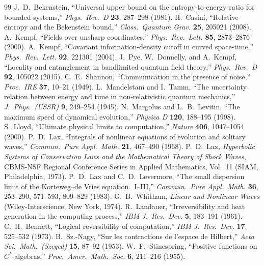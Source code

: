 \documentclass[11pt,a4paper]{article}
\theoremstyle{definition}
\begin{document}
\begin{thebibliography}{99}
 J.\ D.\ Bekenstein, ``Universal upper bound on the entropy-to-energy ratio for bounded systems,'' \emph{Phys.\ Rev.\ D} \textbf{23}, 287--298 (1981).
 H.\ Casini, ``Relative entropy and the Bekenstein bound,'' \emph{Class.\ Quantum Grav.} \textbf{25}, 205021 (2008).
 A.\ Kempf, ``Fields over unsharp coordinates,'' \emph{Phys.\ Rev.\ Lett.} \textbf{85}, 2873--2876 (2000).
 A.\ Kempf, ``Covariant information-density cutoff in curved space-time,'' \emph{Phys.\ Rev.\ Lett.} \textbf{92}, 221301 (2004).
 J.\ Pye, W.\ Donnelly, and A.\ Kempf, ``Locality and entanglement in bandlimited quantum field theory,'' \emph{Phys.\ Rev.\ D} \textbf{92}, 105022 (2015).
 C.\ E.\ Shannon, ``Communication in the presence of noise,'' \emph{Proc.\ IRE} \textbf{37}, 10--21 (1949).
 L.\ Mandelstam and I.\ Tamm, ``The uncertainty relation between energy and time in non-relativistic quantum mechanics,'' \emph{J.\ Phys.\ (USSR)} \textbf{9}, 249--254 (1945).
 N.\ Margolus and L.\ B.\ Levitin, ``The maximum speed of dynamical evolution,'' \emph{Physica D} \textbf{120}, 188--195 (1998).
 S.\ Lloyd, ``Ultimate physical limits to computation,'' \emph{Nature} \textbf{406}, 1047--1054 (2000).
 P.\ D.\ Lax, ``Integrals of nonlinear equations of evolution and solitary waves,'' \emph{Commun.\ Pure Appl.\ Math.} \textbf{21}, 467--490 (1968).
 P.\ D.\ Lax, \emph{Hyperbolic Systems of Conservation Laws and the Mathematical Theory of Shock Waves}, CBMS-NSF Regional Conference Series in Applied Mathematics, Vol.\ 11 (SIAM, Philadelphia, 1973).
 P.\ D.\ Lax and C.\ D.\ Levermore, ``The small dispersion limit of the Korteweg--de Vries equation.\ I--III,'' \emph{Commun.\ Pure Appl.\ Math.} \textbf{36}, 253--290, 571--593, 809--829 (1983).
 G.\ B.\ Whitham, \emph{Linear and Nonlinear Waves} (Wiley-Interscience, New York, 1974).
 R.\ Landauer, ``Irreversibility and heat generation in the computing process,'' \emph{IBM J.\ Res.\ Dev.} \textbf{5}, 183--191 (1961).
 C.\ H.\ Bennett, ``Logical reversibility of computation,'' \emph{IBM J.\ Res.\ Dev.} \textbf{17}, 525--532 (1973).
 B.\ Sz.-Nagy, ``Sur les contractions de l'espace de Hilbert,'' \emph{Acta Sci.\ Math.\ (Szeged)} \textbf{15}, 87--92 (1953).
 W.\ F.\ Stinespring, ``Positive functions on $C^*$-algebras,'' \emph{Proc.\ Amer.\ Math.\ Soc.} \textbf{6}, 211--216 (1955).

\end{thebibliography}
\end{document}
